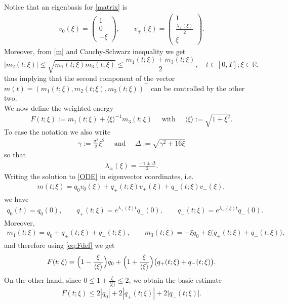 \documentclass{article}
\newcommand{\ang}[1]{\langle #1\rangle}
\begin{document}
Notice that an eigenbasis for \eqref{matrix} is
\begin{align*}
v_0(\xi)=\begin{pmatrix}1\\0\\-\xi\end{pmatrix},\qquad
v_\pm(\xi)=\begin{pmatrix}1\\ \frac{\lambda_\pm(\xi)}{2}\\ \xi\end{pmatrix}.
\end{align*}
Moreover, from \eqref{m} and Cauchy-Schwarz inequality we get 
\begin{equation}\label{eq:cone}
|m_2(t;\xi)|\le \sqrt{m_1(t;\xi)m_3(t;\xi)}\le \frac{m_1(t;\xi)+m_3(t;\xi)}{2}, \quad t\in [0,T];\xi\in\mathbb{R},
\end{equation}
thus implying that the second component of the vector $m(t)=(m_1(t;\xi),m_2(t;\xi),m_3(t;\xi))^{\top}$ can be controlled by the other two.\\
We now define the weighted energy
\begin{equation}\label{eq:Fdef}
F(t;\xi):=m_1(t;\xi)+\ang{\xi}^{-1}m_3(t;\xi)\quad\mbox{ with }\quad \ang{\xi}:=\sqrt{1+\xi^2}.
\end{equation}
To ease the notation we also write
\begin{align*}
\gamma:=\frac{\sigma^2}{2}\xi^2\quad\mbox{ and }\quad\Delta:=\sqrt{\gamma^2+16\xi}
\end{align*}
so that
\begin{align*}
\lambda_\pm(\xi)=\frac{-\gamma\pm \Delta}{2}.
\end{align*}
Writing the solution to \eqref{ODE} in eigenvector coordinates, i.e.
\begin{align*}
m(t;\xi)=q_0v_0(\xi)+q_+(t;\xi)v_+(\xi) + q_-(t;\xi)v_-(\xi), 
\end{align*}
we have
\begin{align}\label{eq:q-evol}
q_0(t)=q_0(0),\qquad
q_+(t;\xi)=e^{\lambda_+(\xi) t}q_+(0),\qquad
q_-(t;\xi)=e^{\lambda_-(\xi) t}q_-(0).
\end{align}
Moreover,
\begin{align*}
m_1(t;\xi)=q_0+q_+(t;\xi)+q_-(t;\xi),\qquad
m_3(t;\xi)=-\xi q_0+\xi\bigl(q_+(t;\xi)+q_-(t;\xi)\bigr),
\end{align*}
and therefore using \eqref{eq:Fdef} we get
\begin{align*}
F(t;\xi)=\Bigl(1-\frac{\xi}{\ang{\xi}}\Bigr)q_0
     +\Bigl(1+\frac{\xi}{\ang{\xi}}\Bigr)\bigl(q_+(t;\xi)+q_-(t;\xi)\bigr).
\end{align*}
On the other hand, since $0\le 1\pm \frac{\xi}{\ang{\xi}}\le 2$, we obtain the basic estimate
\begin{equation}\label{eq:F-basic}
F(t;\xi)\le 2|q_0|+2|q_+(t;\xi)|+2|q_-(t;\xi)|.
\end{equation}
\end{document}
